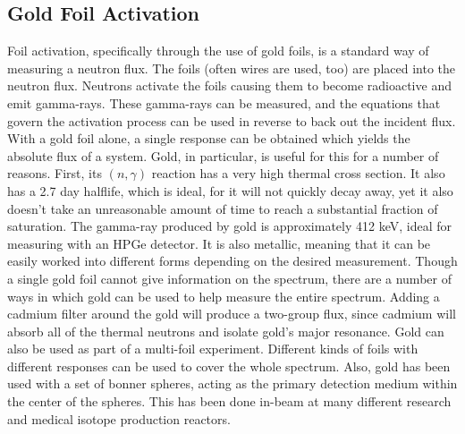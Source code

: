 \subsection{Gold Foil Activation}
Foil activation, specifically through the use of gold foils, is a standard way of measuring a neutron flux.
The foils (often wires are used, too) are placed into the neutron flux.
Neutrons activate the foils causing them to become radioactive and emit gamma-rays.
These gamma-rays can be measured, and the equations that govern the activation process can be used in reverse to back out the incident flux.
With a gold foil alone, a single response can be obtained which yields the absolute flux of a system.
Gold, in particular, is useful for this for a number of reasons.
First, its $(n, \gamma)$ reaction has a very high thermal cross section.
It also has a 2.7 day halflife, which is ideal, for it will not quickly decay away, yet it also doesn't take an unreasonable amount of time to reach a substantial fraction of saturation.
The gamma-ray produced by gold is approximately 412 keV, ideal for measuring with an HPGe detector.
It is also metallic, meaning that it can be easily worked into different forms depending on the desired measurement.
Though a single gold foil cannot give information on the spectrum, there are a number of ways in which gold can be used to help measure the entire spectrum.
Adding a cadmium filter around the gold will produce a two-group flux, since cadmium will absorb all of the thermal neutrons and isolate gold's major resonance.
Gold can also be used as part of a multi-foil experiment.
Different kinds of foils with different responses can be used to cover the whole spectrum.
Also, gold has been used with a set of bonner spheres, acting as the primary detection medium within the center of the spheres.
This has been done in-beam at many different research and medical isotope production reactors.

